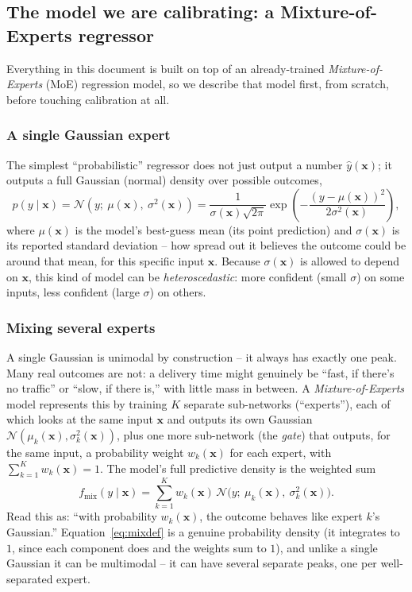 \documentclass[11pt]{article}
\begin{document}
\subsection{The model we are calibrating: a Mixture-of-Experts regressor}
\label{sec:moe}

Everything in this document is built on top of an already-trained \emph{Mixture-of-Experts} (MoE)
regression model, so we describe that model first, from scratch, before touching calibration at
all.

\subsubsection{A single Gaussian expert}

The simplest ``probabilistic'' regressor does not just output a number $\hat y(\bm x)$; it
outputs a full Gaussian (normal) density over possible outcomes,
\begin{equation}
p(y \mid \bm x) = \mathcal N(y;\ \mu(\bm x),\ \sigma^2(\bm x)) = \frac{1}{\sigma(\bm x)\sqrt{2\pi}}
\exp\!\left(-\frac{(y-\mu(\bm x))^2}{2\sigma^2(\bm x)}\right),
\end{equation}
where $\mu(\bm x)$ is the model's best-guess mean (its point prediction) and $\sigma(\bm x)$ is
its reported standard deviation -- how spread out it believes the outcome could be around that
mean, for this specific input $\bm x$. Because $\sigma(\bm x)$ is allowed to depend on $\bm x$,
this kind of model can be \emph{heteroscedastic}: more confident (small $\sigma$) on some inputs,
less confident (large $\sigma$) on others.

\subsubsection{Mixing several experts}

A single Gaussian is unimodal by construction -- it always has exactly one peak. Many real
outcomes are not: a delivery time might genuinely be ``fast, if there's no traffic'' or ``slow, if
there is,'' with little mass in between. A \emph{Mixture-of-Experts} model \cite{jordan1994hierarchical} represents this by
training $K$ separate sub-networks (``experts''), each of which looks at the same input $\bm x$
and outputs its own Gaussian $\mathcal N(\mu_k(\bm x), \sigma_k^2(\bm x))$, plus one more
sub-network (the \emph{gate}) that outputs, for the same input, a probability weight $w_k(\bm x)$
for each expert, with $\sum_{k=1}^K w_k(\bm x) = 1$. The model's full predictive density is the
weighted sum
\begin{equation}
f_{\mathrm{mix}}(y \mid \bm x) = \sum_{k=1}^K w_k(\bm x)\, \mathcal N\big(y;\ \mu_k(\bm x),\
\sigma_k^2(\bm x)\big).
\label{eq:mixdef}
\end{equation}
Read this as: ``with probability $w_k(\bm x)$, the outcome behaves like expert $k$'s Gaussian.''
Equation~\eqref{eq:mixdef} is a genuine probability density (it integrates to $1$, since each
component does and the weights sum to $1$), and unlike a single Gaussian it can be multimodal --
it can have several separate peaks, one per well-separated expert.
\end{document}
